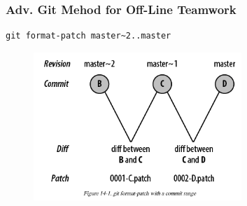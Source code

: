 \documentclass[hyperref={colorlinks=false},handout,10pt]{beamer}
\begin{document}
\begin{frame}
    \frametitle{Adv. Git Mehod for Off-Line Teamwork}
    \begin{lstlisting}
git format-patch master~2..master
    \end{lstlisting}
    \begin{figure}
        \begin{center}
            \includegraphics[width=0.7\textwidth]{images/gitformatpatch.png}
        \end{center}
    \end{figure}
\end{frame}
\end{document}
